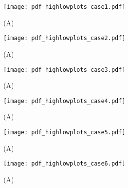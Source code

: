 


\begin{figure}%
	\centering
	\texttt{[image: pdf\_highlowplots\_case1.pdf]}
	\caption{ 
		(A) 
	}
	\label{fig:CRP:XXX}
\end{figure}%
\begin{figure}%
	\centering
	\texttt{[image: pdf\_highlowplots\_case2.pdf]}
	\caption{ 
		(A) 
	}
	\label{fig:CRP:XXX}
\end{figure}%
\begin{figure}%
	\centering
	\texttt{[image: pdf\_highlowplots\_case3.pdf]}
	\caption{ 
		(A) 
	}
	\label{fig:CRP:XXX}
\end{figure}%
\begin{figure}%
	\centering
	\texttt{[image: pdf\_highlowplots\_case4.pdf]}
	\caption{ 
		(A) 
	}
	\label{fig:CRP:XXX}
\end{figure}%
\begin{figure}%
	\centering
	\texttt{[image: pdf\_highlowplots\_case5.pdf]}
	\caption{ 
		(A) 
	}
	\label{fig:CRP:XXX}
\end{figure}%
\begin{figure}%
	\centering
	\texttt{[image: pdf\_highlowplots\_case6.pdf]}
	\caption{ 
		(A) 
	}
	\label{fig:CRP:XXX}
\end{figure}%






